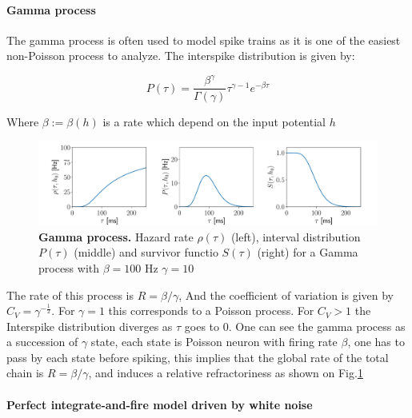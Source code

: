 \documentclass[12pt,twoside]{report}
\begin{document}
\paragraph{Gamma process}




The gamma process is often used to model spike trains as it is one of the easiest non-Poisson process to analyze. The interspike distribution is given by:


\begin{equation}
\label{eq:gamma}
P(\tau)=\frac{\beta^\gamma}{\Gamma(\gamma)}\tau^{\gamma-1}e^{-\beta\tau}
\end{equation}

Where $\beta:=\beta(h)$ is a rate which depend on the input potential $h$


\begin{figure}[h!]
	\includegraphics[width=\linewidth]{gamma.pdf}
	\caption{\textbf{Gamma process.} Hazard rate $\rho(\tau)$ (left), interval distribution $P(\tau)$ (middle) and survivor functio $S(\tau)$ (right) for a Gamma process with $\beta=100$ Hz
		$\gamma=10$ }
	\label{fig:gammaprocess}
\end{figure}


The rate of this process  is $R=\beta/\gamma$, And the coefficient of variation is given by $C_V=\gamma^{-\frac{1}{2}}$. For $\gamma=1$ this corresponds to a Poisson process. For $C_V>1$ the Interspike distribution diverges as $\tau$ goes to $0$.  One can see the gamma process as a succession of $\gamma$ state, each state is Poisson neuron with firing rate $\beta$, one has to pass by each state before spiking,  this implies that the global rate of the total chain is $R=\beta/\gamma$, and induces a relative refractoriness as shown on Fig.\ref{fig:gammaprocess}



\paragraph{Perfect integrate-and-fire model driven by white noise}
\label{sec:pif}
\end{document}
